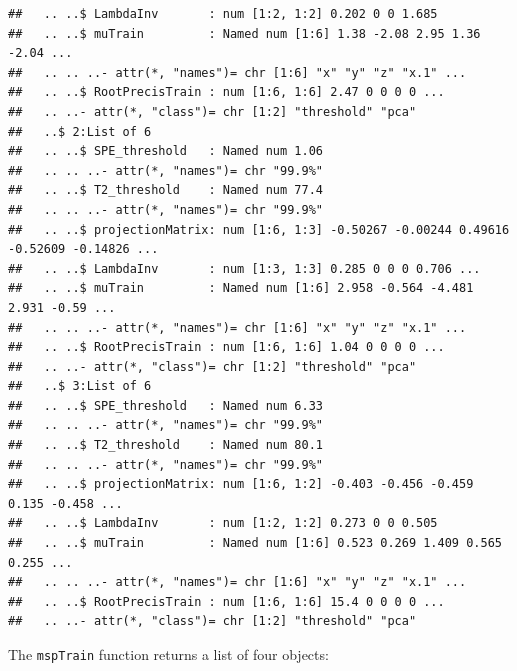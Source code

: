 \documentclass{report}\usepackage[]{graphicx}\usepackage[]{color}
\makeatletter
\newenvironment{kframe}{%
 \def\at@end@of@kframe{}%
 \ifinner\ifhmode%
  \def\at@end@of@kframe{\end{minipage}}%
  \begin{minipage}{\columnwidth}%
 \fi\fi%
 \def\FrameCommand##1{\hskip\@totalleftmargin \hskip-\fboxsep
 \colorbox{shadecolor}{##1}\hskip-\fboxsep
     \hskip-\linewidth \hskip-\@totalleftmargin \hskip\columnwidth}%
 \MakeFramed {\advance\hsize-\width
   \@totalleftmargin\z@ \linewidth\hsize
   \@setminipage}}%
 {\par\unskip\endMakeFramed%
 \at@end@of@kframe}
\newenvironment{knitrout}{}{} %
\makeatother
\begin{document}
\begin{knitrout}
\begin{kframe}
\begin{verbatim}
##   .. ..$ LambdaInv       : num [1:2, 1:2] 0.202 0 0 1.685
##   .. ..$ muTrain         : Named num [1:6] 1.38 -2.08 2.95 1.36 -2.04 ...
##   .. .. ..- attr(*, "names")= chr [1:6] "x" "y" "z" "x.1" ...
##   .. ..$ RootPrecisTrain : num [1:6, 1:6] 2.47 0 0 0 0 ...
##   .. ..- attr(*, "class")= chr [1:2] "threshold" "pca"
##   ..$ 2:List of 6
##   .. ..$ SPE_threshold   : Named num 1.06
##   .. .. ..- attr(*, "names")= chr "99.9%"
##   .. ..$ T2_threshold    : Named num 77.4
##   .. .. ..- attr(*, "names")= chr "99.9%"
##   .. ..$ projectionMatrix: num [1:6, 1:3] -0.50267 -0.00244 0.49616 -0.52609 -0.14826 ...
##   .. ..$ LambdaInv       : num [1:3, 1:3] 0.285 0 0 0 0.706 ...
##   .. ..$ muTrain         : Named num [1:6] 2.958 -0.564 -4.481 2.931 -0.59 ...
##   .. .. ..- attr(*, "names")= chr [1:6] "x" "y" "z" "x.1" ...
##   .. ..$ RootPrecisTrain : num [1:6, 1:6] 1.04 0 0 0 0 ...
##   .. ..- attr(*, "class")= chr [1:2] "threshold" "pca"
##   ..$ 3:List of 6
##   .. ..$ SPE_threshold   : Named num 6.33
##   .. .. ..- attr(*, "names")= chr "99.9%"
##   .. ..$ T2_threshold    : Named num 80.1
##   .. .. ..- attr(*, "names")= chr "99.9%"
##   .. ..$ projectionMatrix: num [1:6, 1:2] -0.403 -0.456 -0.459 0.135 -0.458 ...
##   .. ..$ LambdaInv       : num [1:2, 1:2] 0.273 0 0 0.505
##   .. ..$ muTrain         : Named num [1:6] 0.523 0.269 1.409 0.565 0.255 ...
##   .. .. ..- attr(*, "names")= chr [1:6] "x" "y" "z" "x.1" ...
##   .. ..$ RootPrecisTrain : num [1:6, 1:6] 15.4 0 0 0 0 ...
##   .. ..- attr(*, "class")= chr [1:2] "threshold" "pca"
\end{verbatim}
\end{kframe}
\end{knitrout}
The \texttt{mspTrain} function returns a list of four objects:
\end{document}
